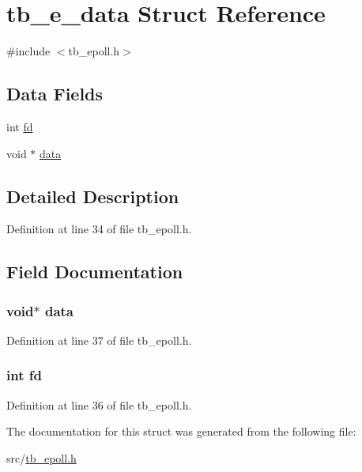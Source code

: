 \hypertarget{structtb__e__data}{\section{tb\-\_\-e\-\_\-data Struct Reference}
\label{structtb__e__data}
}


{\ttfamily \#include $<$tb\-\_\-epoll.\-h$>$}

\subsection*{Data Fields}
\begin{DoxyCompactItemize}
\item 
int \hyperlink{structtb__e__data_a6f8059414f0228f0256115e024eeed4b}{fd}
\item 
void $\ast$ \hyperlink{structtb__e__data_a735984d41155bc1032e09bece8f8d66d}{data}
\end{DoxyCompactItemize}


\subsection{Detailed Description}


Definition at line 34 of file tb\-\_\-epoll.\-h.



\subsection{Field Documentation}
\hypertarget{structtb__e__data_a735984d41155bc1032e09bece8f8d66d}{
\subsubsection[{data}]{\setlength{\rightskip}{0pt plus 5cm}void$\ast$ data}}\label{structtb__e__data_a735984d41155bc1032e09bece8f8d66d}


Definition at line 37 of file tb\-\_\-epoll.\-h.

\hypertarget{structtb__e__data_a6f8059414f0228f0256115e024eeed4b}{
\subsubsection[{fd}]{\setlength{\rightskip}{0pt plus 5cm}int fd}}\label{structtb__e__data_a6f8059414f0228f0256115e024eeed4b}


Definition at line 36 of file tb\-\_\-epoll.\-h.



The documentation for this struct was generated from the following file\-:\begin{DoxyCompactItemize}
\item 
src/\hyperlink{tb__epoll_8h}{tb\-\_\-epoll.\-h}\end{DoxyCompactItemize}
